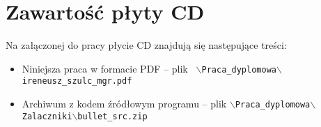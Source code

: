 \appendix
\chapter{Zawartość płyty CD}

Na załączonej do pracy płycie CD znajdują się następujące treści:
\begin{itemize}
 \item Niniejsza praca w formacie PDF -- plik \texttt{ $\backslash$Praca{\_}dyplomowa$\backslash$ireneusz{\_}szulc{\_}mgr.pdf}
 \item Archiwum z kodem źródłowym programu -- plik \texttt{$\backslash$Praca{\_}dyplomowa$\backslash$Zalaczniki$\backslash$bullet{\_}src.zip}
\end{itemize}


